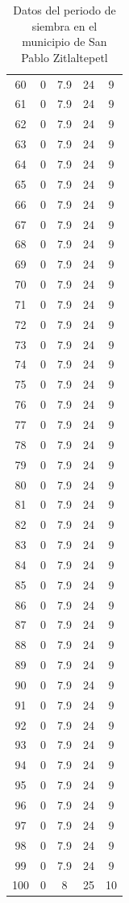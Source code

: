 \documentclass[utf8]{FrontiersinHarvard} %
\begin{document}
\begin{table}[t]
\begin{center}
\begin{tabular}{| c | c | c | c | c | }
    60 & 0 & 7.9 & 24 & 9 \\
    61 & 0 & 7.9 & 24 & 9 \\
    62 & 0 & 7.9 & 24 & 9 \\
    63 & 0 & 7.9 & 24 & 9 \\
    64 & 0 & 7.9 & 24 & 9 \\
    65 & 0 & 7.9 & 24 & 9 \\
    66 & 0 & 7.9 & 24 & 9 \\
    67 & 0 & 7.9 & 24 & 9 \\
    68 & 0 & 7.9 & 24 & 9 \\
    69 & 0 & 7.9 & 24 & 9 \\
    70 & 0 & 7.9 & 24 & 9 \\
    71 & 0 & 7.9 & 24 & 9 \\
    72 & 0 & 7.9 & 24 & 9 \\
    73 & 0 & 7.9 & 24 & 9 \\
    74 & 0 & 7.9 & 24 & 9 \\
    75 & 0 & 7.9 & 24 & 9 \\
    76 & 0 & 7.9 & 24 & 9 \\
    77 & 0 & 7.9 & 24 & 9 \\
    78 & 0 & 7.9 & 24 & 9 \\
    79 & 0 & 7.9 & 24 & 9 \\
    80 & 0 & 7.9 & 24 & 9 \\
    81 & 0 & 7.9 & 24 & 9 \\
    82 & 0 & 7.9 & 24 & 9 \\
    83 & 0 & 7.9 & 24 & 9 \\
    84 & 0 & 7.9 & 24 & 9 \\
    85 & 0 & 7.9 & 24 & 9 \\
    86 & 0 & 7.9 & 24 & 9 \\
    87 & 0 & 7.9 & 24 & 9 \\
    88 & 0 & 7.9 & 24 & 9 \\
    89 & 0 & 7.9 & 24 & 9 \\
    90 & 0 & 7.9 & 24 & 9 \\
    91 & 0 & 7.9 & 24 & 9 \\
    92 & 0 & 7.9 & 24 & 9 \\
    93 & 0 & 7.9 & 24 & 9 \\
    94 & 0 & 7.9 & 24 & 9 \\
    95 & 0 & 7.9 & 24 & 9 \\
    96 & 0 & 7.9 & 24 & 9 \\
    97 & 0 & 7.9 & 24 & 9 \\
    98 & 0 & 7.9 & 24 & 9 \\
    99 & 0 & 7.9 & 24 & 9 \\
    100 & 0 & 8 & 25 & 10 \\




    \hline
    \end{tabular}
    \caption{
        Datos del periodo de siembra en el municipio de San Pablo Zitlaltepetl
    }
    \label{tab:DatosDeSiembra}
    \end{center}
\end{table}
\end{document}
